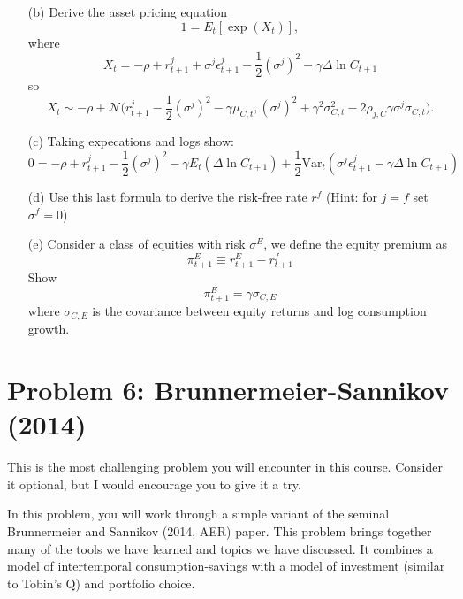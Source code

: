 \documentclass[11pt]{extarticle}
\theoremstyle{plain}
\theoremstyle{definition}
\begin{document}
\begin{enumerate}
\item [(b)] Derive the asset pricing equation
\begin{equation*}
	1 = E_t [\exp(X_t)],
\end{equation*}
where 
\begin{equation*}
	X_t = -\rho + r_{t+1}^j + \sigma^j \epsilon_{t+1}^j - \frac{1}{2} (\sigma^j)^2 - \gamma \Delta \ln C_{t+1} 
\end{equation*}
so
\begin{equation*}
X_t \sim -\rho + \mathcal{N}\bigg(r_{t+1}^j - \frac{1}{2} (\sigma^j)^2 - \gamma \mu_{C,t}, (\sigma^j)^2 + \gamma^2 \sigma_{C,t}^2 - 2 \rho_{j,C} \gamma \sigma^j \sigma_{C,t} \bigg).
\end{equation*}

\item [(c)] Taking expecations and logs show:
\begin{equation}
	0 =  - \rho + r_{t+1}^j - \frac{1}{2} (\sigma^j)^2 - \gamma E_t(\Delta \ln C_{t+1}) + \frac{1}{2} \text{Var}_t( \sigma^j \epsilon_{t+1}^j - \gamma \Delta \ln C_{t+1})
\end{equation}

\item [(d)] Use this last formula to derive the risk-free rate $r^f$ (Hint: for $j=f$ set $\sigma^f=0$)

\item [(e)] Consider a class of equities with risk $\sigma^E$, we define the equity premium as $$\pi_{t+1}^E \equiv r_{t+1}^E - r_{t+1}^f $$
Show $$\pi_{t+1}^E = \gamma \sigma_{C,E}$$ where $\sigma_{C,E}$ is the covariance between equity returns and log consumption growth. 

\end{enumerate}



\vspace{5mm}
\section*{Problem 6: Brunnermeier-Sannikov (2014)}


This is the most challenging problem you will encounter in this course. Consider it optional, but I would encourage you to give it a try. 


In this problem, you will work through a simple variant of the seminal Brunnermeier and Sannikov (2014, AER) paper. This problem brings together many of the tools we have learned and topics we have discussed. It combines a model of intertemporal consumption-savings with a model of investment (similar to Tobin's Q) and portfolio choice.
\end{document}
